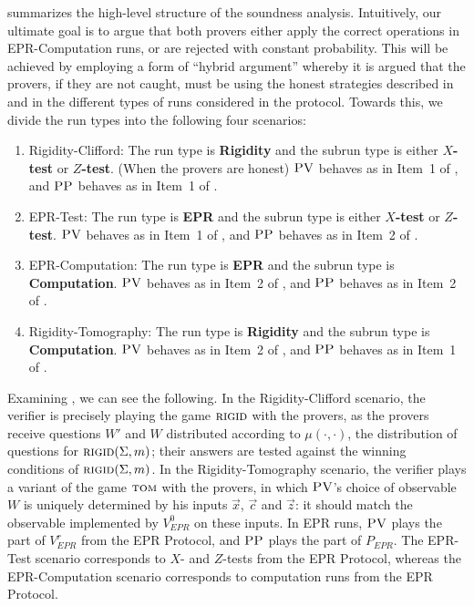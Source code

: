\documentclass{toc}
\newcommand{\rigid}{\textsc{rigid}}
\newcommand{\tom}{\textsc{tom}}
\newcommand{\pv}{\textsc{PV}}
\newcommand{\pp}{\textsc{PP}}
\begin{document}
 summarizes the high-level structure of the soundness analysis. Intuitively, our ultimate goal is to argue that both provers either apply the correct operations in EPR-Computation runs, or are rejected with constant probability. This will be achieved by employing a form of ``hybrid argument'' whereby it is argued that the provers, if they are not caught, must be using the honest strategies described in  and  in the different types of runs considered in the protocol. Towards this, we divide the run types into the following four scenarios:
\begin{enumerate}
\item Rigidity-Clifford: The run type is \textbf{Rigidity} and the subrun type is either \textbf{$X$-test} or \textbf{$Z$-test}. (When the provers are honest) $\pv$ behaves as in Item~1 of , and $\pp$ behaves as in Item~1 of . 
\item EPR-Test: The run type is \textbf{EPR} and the subrun type is either \textbf{$X$-test} or \textbf{$Z$-test}. $\pv$ behaves as  in Item~1 of , and $\pp$ behaves as in Item~2 of . 
\item EPR-Computation: The run type is \textbf{EPR} and the subrun type is \textbf{Computation}. $\pv$ behaves as in Item~2 of , and $\pp$ behaves as in Item~2 of . 
\item Rigidity-Tomography: The run type is \textbf{Rigidity} and the subrun type is \textbf{Computation}. $\pv$ behaves as in Item~2 of , and $\pp$ behaves as in Item~1 of . 
\end{enumerate}
Examining , we can see the following. In the Rigidity-Clifford scenario, the verifier is precisely playing the game $\rigid$ with the provers, as the provers receive questions $W'$ and $W$ distributed according to $\mu(\cdot,\cdot)$, the distribution of questions for $\rigid(\Sigma,m)$; their answers are tested against the winning conditions of $\rigid(\Sigma,m)$. In the Rigidity-Tomography scenario, the verifier plays a variant of the game $\tom$ with the provers, in which $\pv$'s choice of observable $W$ is uniquely determined by his inputs $\vec{x}$, $\vec{c}$ and $\vec{z}$: it should match the observable implemented by $V_{EPR}^0$ on these inputs. In EPR runs, $\pv$ plays the part of $V_{EPR}^r$ from the EPR Protocol, and $\pp$ plays the part of $P_{EPR}$. The EPR-Test scenario corresponds to $X$- and $Z$-tests from the EPR Protocol, whereas the EPR-Computation scenario corresponds to computation runs from the EPR Protocol.
\end{document}
